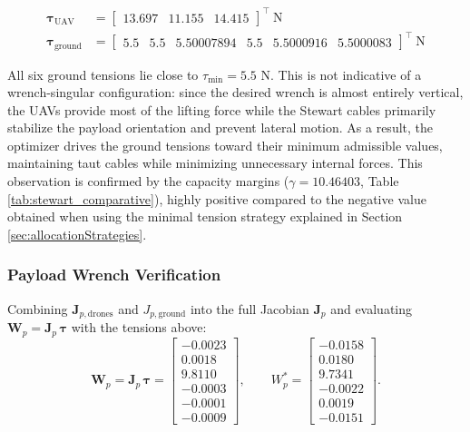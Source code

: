 \begin{equation}
\begin{aligned}
\boldsymbol{\tau}_{\text{UAV}} &= \begin{bmatrix}
13.697 & 11.155 & 14.415 \end{bmatrix}^\top~\text{N} \\
\boldsymbol{\tau}_{\text{ground}} &= \begin{bmatrix}
    5.5 & 5.5 & 5.50007894 & 5.5 & 5.5000916 & 5.5000083
\end{bmatrix}^\top~\text{N}
\end{aligned}
\end{equation}

All six ground tensions lie close to $\tau_{\min}=5.5$ N. This is not indicative of a wrench-singular configuration: since the desired wrench is almost entirely vertical, the UAVs provide most of the lifting force while the Stewart cables primarily stabilize the payload orientation and prevent lateral motion. As a result, the optimizer drives the ground tensions toward their minimum admissible values, maintaining taut cables while minimizing unnecessary internal forces. This observation is confirmed by the capacity margins ($\gamma = 10.46403$, Table \ref{tab:stewart_comparative}), highly positive compared to the negative value obtained when using the minimal tension strategy explained in Section \ref{sec:allocationStrategies}.

\subsubsection{Payload Wrench Verification}
Combining $\mathbf J_{p,\text{drones}}$ and $J_{p,\text{ground}}$ into the full Jacobian $\mathbf J_p$ and evaluating $\mathbf W_p = \mathbf J_p\, \boldsymbol{\tau}$ with the tensions above:
\begin{equation}
\mathbf W_p = \mathbf J_p\, \boldsymbol{\tau} =
\begin{bmatrix} -0.0023 \\ 0.0018 \\ 9.8110 \\ -0.0003 \\ -0.0001 \\ -0.0009 \end{bmatrix},
\qquad
W_p^* =
\begin{bmatrix} -0.0158 \\ 0.0180 \\ 9.7341 \\ -0.0022 \\ 0.0019 \\ -0.0151 \end{bmatrix}.
\end{equation}

